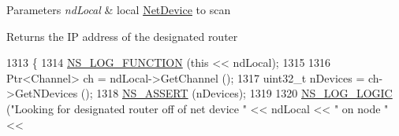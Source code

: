 \begin{DoxyParams}{Parameters}
{\em nd\+Local} & local \hyperlink{classns3_1_1NetDevice}{Net\+Device} to scan \\
\hline
\end{DoxyParams}
\begin{DoxyReturn}{Returns}
the IP address of the designated router 
\end{DoxyReturn}

\begin{DoxyCode}
1313 \{
1314   \hyperlink{log-macros-disabled_8h_a90b90d5bad1f39cb1b64923ea94c0761}{NS\_LOG\_FUNCTION} (\textcolor{keyword}{this} << ndLocal);
1315 
1316   Ptr<Channel> ch = ndLocal->GetChannel ();
1317   uint32\_t nDevices = ch->GetNDevices ();
1318   \hyperlink{assert_8h_a6dccdb0de9b252f60088ce281c49d052}{NS\_ASSERT} (nDevices);
1319 
1320   \hyperlink{group__logging_ga88acd260151caf2db9c0fc84997f45ce}{NS\_LOG\_LOGIC} (\textcolor{stringliteral}{"Looking for designated router off of net device "} << ndLocal << \textcolor{stringliteral}{" on node "} <<
       

\end{DoxyCode}
